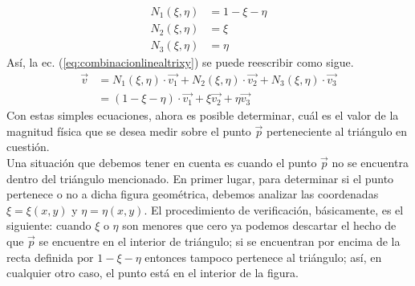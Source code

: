 \begin{equation}
  \label{eq:fftridechieta}
  \begin{split}
    N_1(\xi,\eta) & = 1 - \xi - \eta \\
    N_2(\xi,\eta) & = \xi            \\
    N_3(\xi,\eta) & = \eta           
  \end{split}
\end{equation}
Así, la ec. (\ref{eq:combinacionlinealtrixy}) se puede reescribir como sigue.
\begin{equation}
  \label{eq:combinacionlinealtrichieta}  
  \begin{split}
    \vec{v} & = 
    N_{1}(\xi,\eta) \cdot \vec{v_1} + N_{2}(\xi,\eta) \cdot \vec{v_2}
    + N_{3}(\xi,\eta) \cdot \vec{v_3} \\
    & = (1-\xi-\eta) \cdot \vec{v_1} + \xi\vec{v_2} + \eta\vec{v_3}
    \end{split}
\end{equation}
Con estas simples ecuaciones, ahora es posible determinar, cuál es el valor de la magnitud física que se desea medir sobre el punto $\vec{p}$ perteneciente al triángulo en cuestión.
\\
Una situación que debemos tener en cuenta es cuando el punto $\vec{p}$ no se encuentra dentro del triángulo mencionado. En primer lugar, para determinar si el punto pertenece o no a dicha figura geométrica, debemos analizar las coordenadas $\xi= \xi(x,y)$ y $\eta= \eta(x,y)$. El procedimiento de verificación, básicamente, es el siguiente: cuando $\xi$ o $\eta$ son menores que cero ya podemos descartar el hecho de que $\vec{p}$ se encuentre en el interior de triángulo; si se encuentran por encima de la recta definida por $1-\xi-\eta$ entonces tampoco pertenece al triángulo; así, en cualquier otro caso, el punto está en el interior de la figura. 

